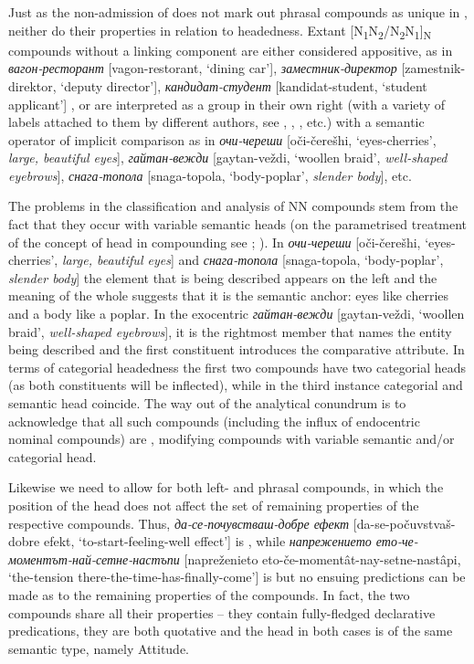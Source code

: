 \documentclass[output=paper]{LSP/langsci}
\begin{document}
Just as the non-admission of  does not mark out phrasal compounds as unique in , neither do their properties in relation to headedness. Extant [N\textsubscript{1}N\textsubscript{2}/N\textsubscript{2}N\textsubscript{1}]\textsubscript{N} compounds without a linking component are either considered appositive, as in \textit{{вагон-ресторант}} [vagon-restorant, ‘dining car’], \textit{{за\-мест\-ник-директор} }[zamestnik-direktor, ‘deputy director’], \textit{{кандидат-студент}} [kan\-di\-dat-student, ‘student applicant’] \citep[56-58]{Radeva2007}, or are interpreted as a group in their own right (with a variety of labels attached to them by different authors, see \citealt{Kirova2012}, \citealt{Murdarov1983}, \citealt{Radeva2007}, etc.) with a semantic operator of implicit comparison \citep[58]{Radeva2007} as in \textit{{очи-череши} }[oči-čerešhi, ‘eyes-cherries’, \textit{large, beautiful eyes}], \textit{{гайтан-вежди} }[gaytan-veždi, ‘woollen braid’, \textit{well-shaped eyebrows}], \textit{{снага-топола} }[snaga-topola, ‘body-poplar’, \textit{slender body}], etc. 

The problems in the classification and analysis of NN compounds stem from the fact that they occur with variable semantic heads (on the parametrised treatment of the concept of head in compounding see \citealt{GuevaraScalise2009};  \citealt{Scalise2006}). In \textit{{очи-череши} }[oči-čerešhi, ‘eyes-cherries’, \textit{large, beautiful eyes}] and \textit{{снага-топола} }[snaga-topola, ‘body-poplar’, \textit{slender body}] the element that is being described appears on the left and the meaning of the whole suggests that it is the semantic anchor: eyes like cherries and a body like a poplar. In the exocentric \textit{{гайтан-вежди} }[gaytan-veždi, ‘woollen braid’, \textit{well-shaped eyebrows}], it is the rightmost member that names the entity being described and the first constituent introduces the comparative attribute. In terms of categorial headedness the first two compounds have two categorial heads (as both constituents will be inflected), while in the third instance categorial and semantic head coincide. The way out of the analytical conundrum is to acknowledge that all such compounds (including the influx of endocentric  nominal compounds) are , modifying compounds with variable semantic and\slash or categorial head.

Likewise we need to allow for both left- and  phrasal compounds, in which the position of the head does not affect the set of remaining properties of the respective compounds. Thus, \textit{{да-се}-{почувстваш-добре ефект}} [da-se-počuvstvaš-dobre efekt, ‘to-start-feeling-well effect’] is , while \textit{{напрежението ето}-{че-моментът-най-сетне}-{настъпи}} [napreženieto eto-če-\linebreak momentât-nay-setne-nastâpi, ‘the-tension there-the-time-has-finally-come’] is  but no ensuing predictions can be made as to the remaining properties of the compounds. In fact, the two compounds share all their properties – they contain fully-fledged declarative predications, they are both quotative and the head in both cases is of the same semantic type, namely Attitude.
\end{document}

